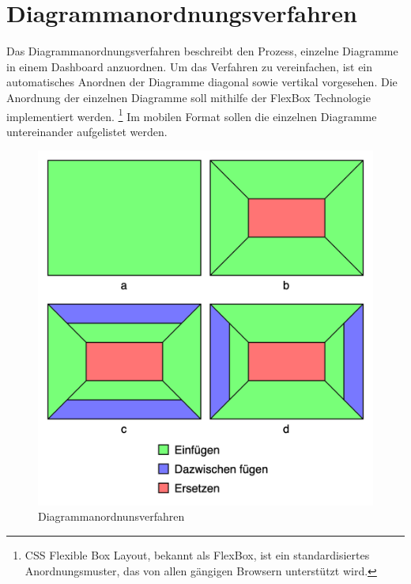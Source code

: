 \section{Diagrammanordnungsverfahren}
\label{sec:diagrammanordnungsverfahren}
Das Diagrammanordnungsverfahren beschreibt den Prozess, einzelne Diagramme in einem Dashboard anzuordnen.
Um das Verfahren zu vereinfachen, ist ein automatisches Anordnen der Diagramme diagonal sowie vertikal vorgesehen.
Die Anordnung der einzelnen Diagramme soll mithilfe der FlexBox Technologie implementiert werden.
\footnote{CSS Flexible Box Layout, bekannt als FlexBox, ist ein standardisiertes Anordnungsmuster, das von allen gängigen Browsern unterstützt wird.\cite{CanIUseFlexBox}}
Im mobilen Format sollen die einzelnen Diagramme untereinander aufgelistet werden. 

\begin{figure}
    \begin{center}
    \includegraphics[scale=0.2]{img/abbildungen/DiagrammanordnungsverfahrenMitLegende}
    \end{center}
    \caption{Diagrammanordnunsverfahren}
    \label{figure:diagrammanordnungabbildung}
\end{figure}

